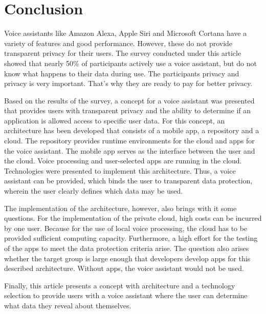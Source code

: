 \section{Conclusion}
Voice assistants like Amazon Alexa, Apple Siri and Microsoft Cortana have a variety of features and good performance. However, these do not provide transparent privacy for their users. The survey conducted under this article showed that nearly 50\% of participants actively use a voice assistant, but do not know what happens to their data during use. The participants privacy and privacy is very important. That's why they are ready to pay for better privacy.

Based on the results of the survey, a concept for a voice assistant was presented that provides users with transparent privacy and the ability to determine if an application is allowed access to specific user data. For this concept, an architecture has been developed that consists of a mobile app, a repository and a cloud. The repository provides runtime environments for the cloud and apps for the voice assistant. The mobile app serves as the interface between the user and the cloud. Voice processing and user-selected apps are running in the cloud. Technologies were presented to implement this architecture. Thus, a voice assistant can be provided, which binds the user to transparent data protection, wherein the user clearly defines which data may be used.

The implementation of the architecture, however, also brings with it some questions. For the implementation of the private cloud, high costs can be incurred by one user. Because for the use of local voice processing, the cloud has to be provided sufficient computing capacity. Furthermore, a high effort for the testing of the apps to meet the data protection criteria arise. The question also arises whether the target group is large enough that developers develop apps for this described architecture. Without apps, the voice assistant would not be used.

Finally, this article presents a concept with architecture and a technology selection to provide users with a voice assistant where the user can determine what data they reveal about themselves.